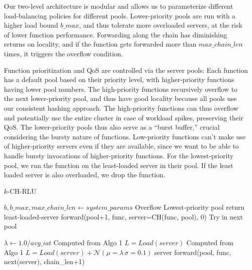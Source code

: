 Our two-level architecture is modular and allows us to parameterize different load-balancing policies for different pools.
Lower-priority pools are run with a higher load bound $b\_max$, and thus tolerate more overloaded servers, at the risk of lower function performance.
Forwarding along the chain has diminishing returns on locality, and if the function gets forwarded more than $max\_chain\_len$ times, it triggers the overflow condition.

Function prioritization and QoS are controlled via the server pools: Each function has a default pool based on their priority level, with higher-priority functions having lower pool numbers. 
The high-priority functions recursively overflow to the next lower-priority pool, and thus have good locality because all pools use our consistent hashing approach. 
The high-priority functions can thus overflow and potentially use the entire cluster in case of workload spikes, preserving their QoS. 
The lower-priority pools thus also serve as a ``burst buffer,'' crucial considering the bursty nature of functions. 
Low-priority functions can't make use of higher-priority servers even if they are available, since we want to be able to handle bursty invocations of higher-priority functions. 
For the lowest-priority pool, we run the function on the least-loaded server in their pool. 
%
If the least loaded server is also overloaded, we drop the function.
\begin{algorithm}[t]
  \caption{$k$-CH-RLU}
  \begin{algorithmic}[1]
    \State $b, b\_max, max\_chain\_len \gets system\_params $
     \Comment Overflow 
     \Comment Lowest-priority pool
    return least-loaded-server
    \Else \State forward(pool+1, func, server=CH(func, pool), 0) \Comment Try in next pool 
    \EndIf 
    \EndIf 

    \State $\lambda \gets 1.0 / avg\_iat$ \Comment Computed from Algo 1
     \State $L=Load(server)$
     \Comment Computed from Algo 1 
         \State $L = Load(server) + \mathcal{N}(\mu=\lambda\,\sigma=0.1)$
    \EndIf 
       \State server
\Else \State forward(pool, func, next(server), chain\_len+1)
       \EndIf
       \EndProcedure
    \end{algorithmic}
\label{algo:PopularRLUPolicy}
\end{algorithm}

